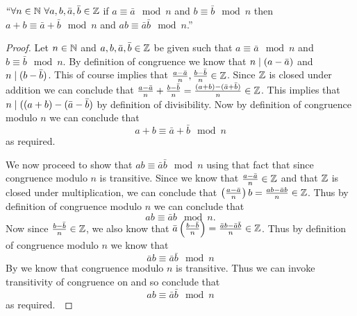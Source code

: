         \begin{lemma}
            $``\forall n \in \mathbb{N} \ \forall a, b, \bar{a}, \bar{b} \in \mathbb{Z}$
            if $a \equiv \bar{a} \mod n$ and $b \equiv \bar{b} \mod n$ then
            $a + b \equiv \bar{a} + \bar{b} \mod n$ and $ab \equiv \bar{a}\bar{b} \mod n$.''
        \end{lemma}
        \begin{proof}
            Let $n \in \mathbb{N}$ and $a, b, \bar{a}, \bar{b} \in \mathbb{Z}$ be given such
            that $a \equiv \bar{a} \mod n$ and $b \equiv \bar{b} \mod n$. By definition 
            of congruence we know that $n \mid (a - \bar{a})$ and $n \mid (b - \bar{b})$.
            This of course implies that $\frac{a - \bar{a}}{n}, \frac{b - \bar{b}}{n} \in \mathbb{Z}$.
            Since $\mathbb{Z}$ is closed under addition we can conclude that
            $\frac{a - \bar{a}}{n} + \frac{b - \bar{b}}{n} = \frac{(a + b) - (\bar{a} + \bar{b})}{n} \in \mathbb{Z}$.
            This implies that $n \mid ((a + b) - (\bar{a} - \bar{b})$ by definition of divisibility.
            Now by definition of congruence modulo $n$ we can conclude that 
            \[
                a + b \equiv \bar{a} + \bar{b} \mod n
            \]
            as required.

            We now proceed to show that $ab \equiv \bar{a}\bar{b} \mod n$ using that fact
            that since congruence modulo $n$ is transitive. Since we know that $\frac{a - \bar{a}}{n} \in \mathbb{Z}$
            and that $\mathbb{Z}$ is closed under multiplication, we can conclude that
            $\left(\frac{a - \bar{a}}{n}\right)b = \frac{ab - \bar{a}b}{n} \in \mathbb{Z}$.
            Thus by definition of congruence modulo $n$ we can conclude that
            \begin{equation}
                ab \equiv \bar{a}b \mod n.
                \label{Modular Arithmetic equation 1}
            \end{equation}
            Now since $\frac{b - \bar{b}}{n} \in \mathbb{Z}$, we also know that
            $\bar{a}\left(\frac{b - \bar{b}}{n}\right) = \frac{\bar{a}b - \bar{a}\bar{b}}{n} \in \mathbb{Z}$.
            Thus by definition of congruence modulo $n$ we know that
            \begin{equation}
                \bar{a}b \equiv \bar{a}\bar{b} \mod n
                \label{Modular Arithmetic equation 2}
            \end{equation}
            By  we know that congruence modulo $n$
            is transitive. Thus we can invoke transitivity of congruence on
             and 
            so conclude that
            \[
                ab \equiv \bar{a}\bar{b} \mod n
            \]
            as required.~\QED
        \end{proof}
